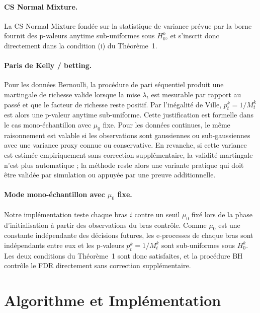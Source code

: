 \documentclass[10.5pt,a4paper]{article}
\begin{document}
\paragraph{CS Normal Mixture.}
La CS Normal Mixture fondée sur la statistique de variance prévue par la
borne fournit des p-valeurs anytime sub-uniformes sous $H_0^k$, et s'inscrit
donc directement dans la condition (i) du Théorème~1.

\paragraph{Paris de Kelly / betting.}
Pour les données Bernoulli, la procédure de pari séquentiel produit une
martingale de richesse valide lorsque la mise $\lambda_t$ est mesurable par
rapport au passé et que le facteur de richesse reste positif. Par l'inégalité
de Ville, $p_t^k = 1/M_t^k$ est alors une p-valeur anytime sub-uniforme.
Cette justification est formelle dans le cas mono-échantillon avec $\mu_0$
fixe. Pour les données continues, le même raisonnement est valable si les
observations sont gaussiennes ou sub-gaussiennes avec une variance proxy
connue ou conservative. En revanche, si cette variance est estimée
empiriquement sans correction supplémentaire, la validité martingale n'est
plus automatique ; la méthode reste alors une variante pratique qui doit être
validée par simulation ou appuyée par une preuve additionnelle.

\paragraph{Mode mono-échantillon avec $\mu_0$ fixe.}
Notre implémentation teste chaque bras $i$ contre un seuil $\mu_0$ fixé lors
de la phase d'initialisation à partir des observations du bras contrôle.
Comme $\mu_0$ est une constante indépendante des décisions futures, les
e-processes de chaque bras sont indépendants entre eux et les p-valeurs
$p_t^k = 1/M_t^k$ sont sub-uniformes sous $H_0^k$. Les deux conditions
du Théorème~1 sont donc satisfaites, et la procédure BH contrôle le FDR
directement sans correction supplémentaire.



\section{Algorithme et Impl\'ementation}
\label{sec:algo}
\end{document}
